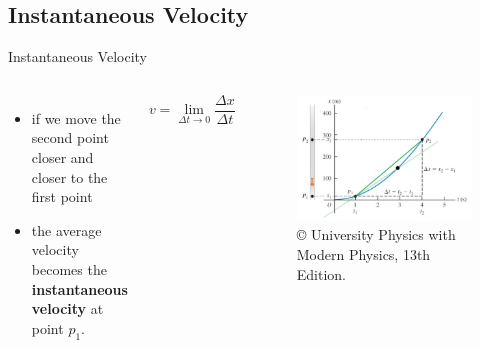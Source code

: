 \documentclass[]{beamer}
\begin{document}
\subsection{Instantaneous Velocity}
\begin{frame}
Instantaneous Velocity
\vspace{3mm}





   \begin{columns}[c]
   \column{2in}  %
  
\begin{itemize}
\item  if we move the second point closer and closer to the first point
\item   the average velocity becomes the \textbf{instantaneous velocity} at point $p_1$.

\end{itemize}

\begin{equation*}
\boxed{v=\lim_{\Delta t\to0} \frac{\Delta x}{\Delta t}}
\end{equation*}


   \column{2.5in}
   
   \begin{figure}[h!]
 
  \includegraphics[width=1.\textwidth]{images/5.jpg}
   \caption{ {\tiny © University Physics 
   with Modern Physics, 13th Edition.} }
\end{figure}



   \end{columns}
   
   
   
   

 \end{frame}
\end{document}
